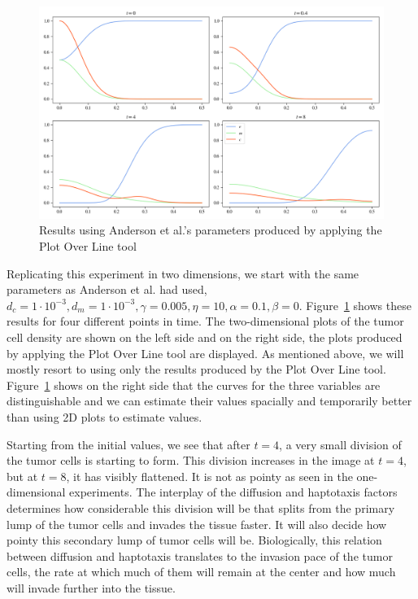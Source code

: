 \begin{figure}[ht!]
 \centering
 \includegraphics[width=\textwidth]{resources/images/first_replication_POL.png}
 \caption{Results using Anderson et al.'s parameters produced by applying the Plot Over Line tool}
 \label{fig:unadjsuted_replication}
\end{figure}
Replicating this experiment in two dimensions, we start with the same parameters as Anderson et al. had used, $d_c = 1\cdot 10^{-3}, d_m = 1\cdot 10^{-3}, \gamma = 0.005, \eta = 10, \alpha = 0.1, \beta = 0$. Figure~\ref{fig:unadjsuted_replication} shows these results for four different points in time. The two-dimensional plots of the tumor cell density are shown on the left side and on the right side, the plots produced by applying the Plot Over Line tool are displayed. As mentioned above, we will mostly resort to using only the results produced by the Plot Over Line tool. Figure~\ref{fig:unadjsuted_replication} shows on the right side that the curves for the three variables are distinguishable and we can estimate their values spacially and temporarily better than using 2D plots to estimate values.

Starting from the initial values, we see that after $t=4$, a very small division of the tumor cells is starting to form. This division increases in the image at $t=4$, but at $t=8$, it has visibly flattened. It is not as pointy as seen in the one-dimensional experiments. The interplay of the diffusion and haptotaxis factors determines how considerable this division will be that splits from the primary lump of the tumor cells and invades the tissue faster. It will also decide how pointy this secondary lump of tumor cells will be. Biologically, this relation between diffusion and haptotaxis translates to the invasion pace of the tumor cells, the rate at which much of them will remain at the center and how much will invade further into the tissue.

